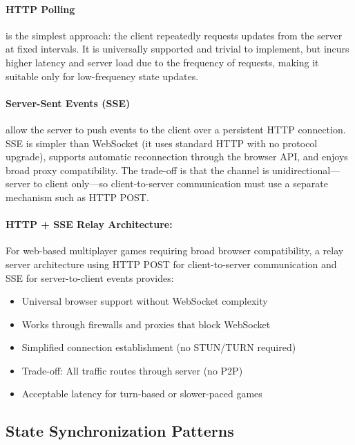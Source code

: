 \paragraph*{HTTP Polling} is the simplest approach: the client repeatedly requests updates from the server at fixed intervals. It is universally supported and trivial to implement, but incurs higher latency and server load due to the frequency of requests, making it suitable only for low-frequency state updates.

\paragraph*{Server-Sent Events (SSE)} allow the server to push events to the client over a persistent HTTP connection. SSE is simpler than WebSocket (it uses standard HTTP with no protocol upgrade), supports automatic reconnection through the browser API, and enjoys broad proxy compatibility. The trade-off is that the channel is unidirectional---server to client only---so client-to-server communication must use a separate mechanism such as HTTP POST.

\paragraph*{HTTP + SSE Relay Architecture:}

For web-based multiplayer games requiring broad browser compatibility, a relay server architecture using HTTP POST for client-to-server communication and SSE for server-to-client events provides:

\begin{itemize}
    \item Universal browser support without WebSocket complexity
    \item Works through firewalls and proxies that block WebSocket
    \item Simplified connection establishment (no STUN/TURN required)
    \item Trade-off: All traffic routes through server (no P2P)
    \item Acceptable latency for turn-based or slower-paced games
\end{itemize}

\subsection{State Synchronization Patterns}
\label{subsec:state-sync}

